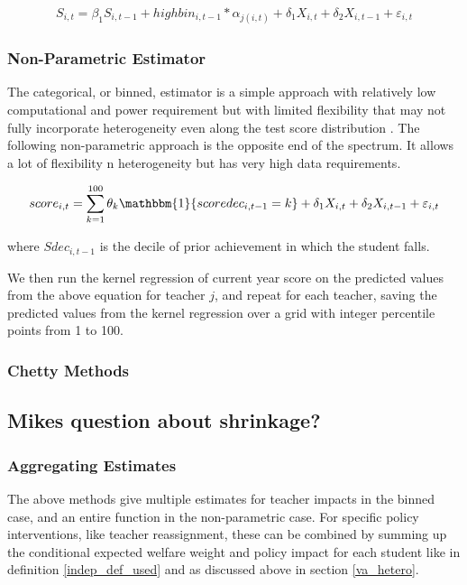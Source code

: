\documentclass{article}
\theoremstyle{definition}
\theoremstyle{definition}
\theoremstyle{definition}
\theoremstyle{definition}
\begin{document}
        \begin{align*}
            S_{i,t} = \beta_1 S_{i,t-1} + highbin_{i,t-1}*\alpha_{j(i, t)} + \delta_1 X_{i, t} + \delta_2 X_{i, t-1} + \varepsilon_{i, t}
        \end{align*}

        \subsubsection{Non-Parametric Estimator}
        The categorical, or binned, estimator is a simple approach with relatively low computational and power requirement but with limited flexibility that may not fully incorporate heterogeneity even along the test score distribution . The following non-parametric approach is the opposite end of the spectrum. It allows a lot of flexibility n heterogeneity but has very high data requirements. 
        
        \begin{align*}
            score_{i,t} = \sum_{k=1}^{100} \theta_k \mathbbm{1}\{scoredec_{i, t-1} = k\} + \delta_1 X_{i, t} + \delta_2 X_{i, t-1} + \varepsilon_{i, t}
        \end{align*}
            
        \noindent where $Sdec_{i, t-1}$ is the decile of prior achievement in which the student falls. 
        
      We then run the kernel regression of current year score on the predicted values from the above equation for teacher $j$, and repeat for each teacher, saving the predicted values from the kernel regression over a grid with integer percentile points from 1 to 100.

        \subsubsection{Chetty Methods}

            
        \subsection{Mikes question about shrinkage?}

        \subsubsection{Aggregating Estimates}
        The above methods give multiple estimates for teacher impacts in the binned case, and an entire function in the non-parametric case. For specific policy interventions, like teacher reassignment, these can be combined by summing up the conditional expected welfare weight and policy impact for each student like in definition \ref{indep_def_used} and as discussed above in section \ref{va_hetero}. 
\end{document}
